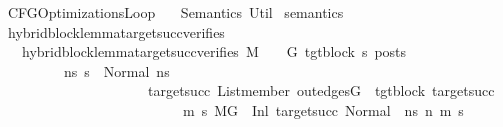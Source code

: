 %
\begin{isabellebody}%
%
%
\isadelimtheory
%
\endisadelimtheory
%
\isatagtheory
{}\isamarkupfalse%
\ CFGOptimizationsLoop\isanewline
\ \ \ Semantics\ Util\isanewline
{}%
\endisatagtheory
{\isafoldtheory}%
%
\isadelimtheory
\isanewline
%
\endisadelimtheory
\isanewline
{}\isamarkupfalse%
\ semantics\ \isanewline
\isanewline
{}\isamarkupfalse%
\ hybrid{\isacharunderscore}{\kern0pt}block{\isacharunderscore}{\kern0pt}lemma{\isacharunderscore}{\kern0pt}target{\isacharunderscore}{\kern0pt}succ{\isacharunderscore}{\kern0pt}verifies\isanewline
\ \ \ {\isachardoublequoteopen}hybrid{\isacharunderscore}{\kern0pt}block{\isacharunderscore}{\kern0pt}lemma{\isacharunderscore}{\kern0pt}target{\isacharunderscore}{\kern0pt}succ{\isacharunderscore}{\kern0pt}verifies\ M\ {\isasymLambda}\ {\isasymGamma}\ {\isasymOmega}\ G{\isacharprime}{\kern0pt}\ tgt{\isacharunderscore}{\kern0pt}block\ s{}{\isacharprime}{\kern0pt}\ posts\ {\isasymequiv}\isanewline
\ \ \ \ \ \ \ \ \ {\isacharparenleft}{\kern0pt}{\isasymforall}ns{}{\isacharprime}{\kern0pt}{\isachardot}{\kern0pt}\ s{}{\isacharprime}{\kern0pt}\ {\isacharequal}{\kern0pt}\ Normal\ ns{}{\isacharprime}{\kern0pt}\ {\isasymlongrightarrow}\isanewline
\ \ \ \ \ \ \ \ \ \ \ \ \ \ \ \ \ \ \ \ \ {\isacharparenleft}{\kern0pt}{\isasymforall}target{\isacharunderscore}{\kern0pt}succ{\isachardot}{\kern0pt}\ List{\isachardot}{\kern0pt}member\ {\isacharparenleft}{\kern0pt}out{\isacharunderscore}{\kern0pt}edges{\isacharparenleft}{\kern0pt}G{\isacharprime}{\kern0pt}{\isacharparenright}{\kern0pt}\ {\isacharbang}{\kern0pt}\ tgt{\isacharunderscore}{\kern0pt}block{\isacharparenright}{\kern0pt}\ target{\isacharunderscore}{\kern0pt}succ\ {\isasymlongrightarrow}\isanewline
\ \ \ \ \ \ \ \ \ \ \ \ \ \ \ \ \ \ \ \ \ \ \ \ \ \ {\isacharparenleft}{\kern0pt}{\isasymforall}m{}{\isacharprime}{\kern0pt}\ s{}{\isacharprime}{\kern0pt}{\isachardot}{\kern0pt}\ {\isacharparenleft}{\kern0pt}M{\isacharcomma}{\kern0pt}{\isasymLambda}{\isacharcomma}{\kern0pt}{\isasymGamma}{\isacharcomma}{\kern0pt}{\isasymOmega}{\isacharcomma}{\kern0pt}G{\isacharprime}{\kern0pt}\ {\isasymturnstile}\ {\isacharparenleft}{\kern0pt}Inl\ target{\isacharunderscore}{\kern0pt}succ{\isacharcomma}{\kern0pt}\ {\isacharparenleft}{\kern0pt}Normal\ \ ns{}{\isacharprime}{\kern0pt}{\isacharparenright}{\kern0pt}{\isacharparenright}{\kern0pt}\ {\isacharminus}{\kern0pt}n{\isasymrightarrow}{\isacharasterisk}{\kern0pt}\ {\isacharparenleft}{\kern0pt}m{}{\isacharprime}{\kern0pt}{\isacharcomma}{\kern0pt}\ s{}{\isacharprime}{\kern0pt}{\isacharparenright}{\kern0pt}{\isacharparenright}{\kern0pt}\ {\isasymlongrightarrow}\isanewline

\end{isabellebody}
